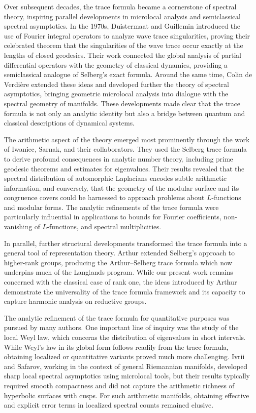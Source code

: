 Over subsequent decades, the trace formula became a cornerstone of spectral
theory, inspiring parallel developments in microlocal analysis and semiclassical
spectral asymptotics. In the 1970s, Duistermaat and Guillemin introduced the
use of Fourier integral operators to analyze wave trace singularities, proving
their celebrated theorem that the singularities of the wave trace occur exactly
at the lengths of closed geodesics. Their work connected the global analysis of
partial differential operators with the geometry of classical dynamics,
providing a semiclassical analogue of Selberg’s exact formula. Around the same
time, Colin de Verdière extended these ideas and developed further the theory
of spectral asymptotics, bringing geometric microlocal analysis into dialogue
with the spectral geometry of manifolds. These developments made clear that the
trace formula is not only an analytic identity but also a bridge between
quantum and classical descriptions of dynamical systems.

The arithmetic aspect of the theory emerged most prominently through the work
of Iwaniec, Sarnak, and their collaborators. They used the Selberg trace
formula to derive profound consequences in analytic number theory, including
prime geodesic theorems and estimates for eigenvalues. Their results revealed
that the spectral distribution of automorphic Laplacians encodes subtle
arithmetic information, and conversely, that the geometry of the modular
surface and its congruence covers could be harnessed to approach problems about
$L$-functions and modular forms. The analytic refinements of the trace formula
were particularly influential in applications to bounds for Fourier
coefficients, non-vanishing of $L$-functions, and spectral multiplicities.

In parallel, further structural developments transformed the trace formula into
a general tool of representation theory. Arthur extended Selberg’s approach to
higher-rank groups, producing the Arthur–Selberg trace formula which now
underpins much of the Langlands program. While our present work remains
concerned with the classical case of rank one, the ideas introduced by Arthur
demonstrate the universality of the trace formula framework and its capacity to
capture harmonic analysis on reductive groups.

The analytic refinement of the trace formula for quantitative purposes was
pursued by many authors. One important line of inquiry was the study of the
local Weyl law, which concerns the distribution of eigenvalues in short
intervals. While Weyl’s law in its global form follows readily from the trace
formula, obtaining localized or quantitative variants proved much more
challenging. Ivrii and Safarov, working in the context of general Riemannian
manifolds, developed sharp local spectral asymptotics using microlocal tools,
but their results typically required smooth compactness and did not capture the
arithmetic richness of hyperbolic surfaces with cusps. For such arithmetic
manifolds, obtaining effective and explicit error terms in localized spectral
counts remained elusive.

